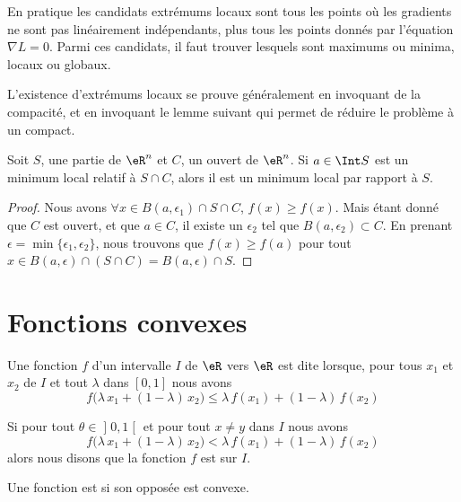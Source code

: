 En pratique les candidats extrémums locaux sont tous les points où les gradients ne sont pas linéairement indépendants, plus tous les points donnés par l'équation $\nabla L=0$. Parmi ces candidats, il faut trouver lesquels sont maximums ou minima, locaux ou globaux.

L'existence d'extrémums locaux se prouve généralement en invoquant de la compacité, et en invoquant le lemme suivant qui permet de réduire le problème à un compact.

\begin{lemma}       \label{LemmeMinSCimpliqueS}
    Soit $S$, une partie de $\eR^n$ et $C$, un ouvert de $\eR^n$. Si $a\in\Int S$ est un minimum local relatif à $S\cap C$, alors il est un minimum local par rapport à $S$.
\end{lemma}

\begin{proof}
    Nous avons $\forall x\in B(a,\epsilon_1)\cap S\cap C$, $f(x)\geq f(x)$. Mais étant donné que $C$ est ouvert, et que $a\in C$, il existe un $\epsilon_2$ tel que $B(a,\epsilon_2)\subset C$. En prenant $\epsilon=\min\{ \epsilon_1,\epsilon_2 \}$, nous trouvons que $f(x)\geq f(a)$ pour tout $x\in B(a,\epsilon)\cap(S\cap C)=B(a,\epsilon)\cap S$.
\end{proof}

\section{Fonctions convexes}
\label{SECooVZWWooUjxXYi}

\begin{definition}  \label{DefVQXRJQz}
    Une fonction $f$ d’un intervalle $I$ de \( \eR\) vers \( \eR\) est dite  lorsque, pour tous \( x_1\) et \( x_2\) de $I$ et tout $\lambda$ dans $[0, 1]$ nous avons
    \begin{equation}        \label{EQooYNAPooFePQZy}
        f\big(\lambda\, x_1+(1-\lambda)\, x_2\big) \leq \lambda\, f(x_1)+(1-\lambda)\, f(x_2)
    \end{equation}

    Si pour tout \( \theta\in \mathopen] 0 , 1 \mathclose[\) et pour tout \( x\neq y\) dans \( I\) nous avons
    \begin{equation}
        f\big(\lambda\, x_1+(1-\lambda)\, x_2\big) < \lambda\, f(x_1)+(1-\lambda)\, f(x_2)
    \end{equation}
    alors nous disons que la fonction \( f\) est  sur \( I\).

    Une fonction est  si son opposée est convexe.
\end{definition}

